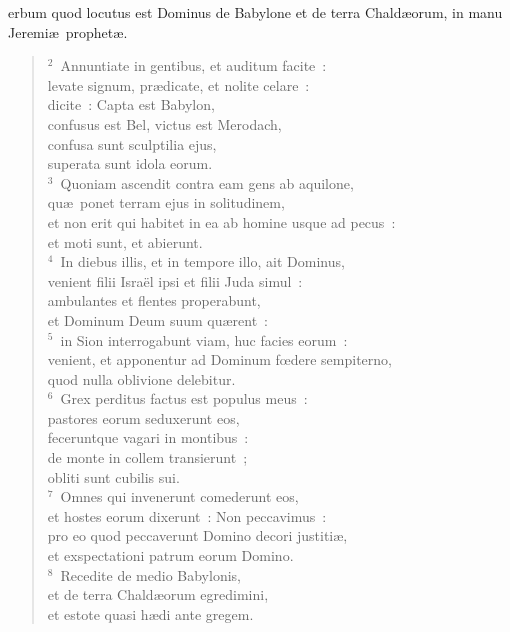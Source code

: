 \bchapter
{}erbum quod locutus est Dominus de Babylone et de terra Chald\ae orum, in manu Jeremi\ae\ prophet\ae .
\begin{flushleft}\begin{verse}\vspace{6pt}${}^{2}$~Annuntiate in gentibus, et auditum facite~:\\ levate signum, pr\ae dicate, et nolite celare~:\\ dicite~: Capta est Babylon,\\ confusus est Bel, victus est Merodach,\\ confusa sunt sculptilia ejus,\\ superata sunt idola eorum.\\
${}^{3}$~Quoniam ascendit contra eam gens ab aquilone,\\ qu\ae\ ponet terram ejus in solitudinem,\\ et non erit qui habitet in ea ab homine usque ad pecus~:\\ et moti sunt, et abierunt.\\
${}^{4}$~In diebus illis, et in tempore illo, ait Dominus,\\ venient filii Isra\"el ipsi et filii Juda simul~:\\ ambulantes et flentes properabunt,\\ et Dominum Deum suum qu\ae rent~:\\
${}^{5}$~in Sion interrogabunt viam, huc facies eorum~:\\ venient, et apponentur ad Dominum fœdere sempiterno,\\ quod nulla oblivione delebitur.\\
${}^{6}$~Grex perditus factus est populus meus~:\\ pastores eorum seduxerunt eos,\\ feceruntque vagari in montibus~:\\ de monte in collem transierunt~;\\ obliti sunt cubilis sui.\\
${}^{7}$~Omnes qui invenerunt comederunt eos,\\ et hostes eorum dixerunt~: Non peccavimus~:\\ pro eo quod peccaverunt Domino decori justiti\ae ,\\ et exspectationi patrum eorum Domino.\\
${}^{8}$~Recedite de medio Babylonis,\\ et de terra Chald\ae orum egredimini,\\ et estote quasi h\ae di ante gregem.\\

\end{verse}
\end{flushleft}
